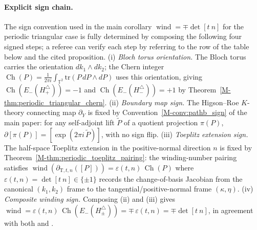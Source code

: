 \documentclass[11pt]{article}
\numberwithin{equation}{section}
\theoremstyle{definition}
\theoremstyle{remark}
\newcommand{\tr}{\mathrm{tr}}
\newcommand{\Ch}{\operatorname{Ch}}
\begin{document}
\paragraph{Explicit sign chain.}
The sign convention used in the main corollary \(\operatorname{wind}=\mp\det[t\ n]\) for the
periodic triangular case is fully determined by composing the following four signed steps; a
referee can verify each step by referring to the row of the table below and the cited
proposition.
(i) \emph{Bloch torus orientation.} The Bloch torus carries the orientation
\(dk_1\wedge dk_2\); the Chern integer
\(\Ch(P)=\frac{1}{2\pi i}\int_{\mathbb T^2}\tr(P\,dP\wedge dP)\) uses this orientation, giving
\(\Ch(E_-(H_+^\triangle))=-1\) and \(\Ch(E_-(H_-^\triangle))=+1\) by
Theorem~\ref{M-thm:periodic_triangular_chern}.
(ii) \emph{Boundary map sign.} The Higson--Roe \(K\)-theory connecting map \(\partial_Y\) is
fixed by Convention~\ref{M-conv:pathb_sign} of the main paper: for any self-adjoint lift
\(\tilde P\) of a quotient projection \(\pi(P)\),
\(\partial[\pi(P)]=[\exp(2\pi i\,\tilde P)]\), with no sign flip.
(iii) \emph{Toeplitz extension sign.} The half-space Toeplitz extension in the positive-normal
direction \(n\) is fixed by Theorem~\ref{M-thm:periodic_toeplitz_pairing}: the winding-number
pairing satisfies \(\operatorname{wind}(\partial_{\mathrm T,t,n}([P]))=\varepsilon(t,n)\,\Ch(P)\)
where \(\varepsilon(t,n)=\det[t\ n]\in\{\pm 1\}\) records the change-of-basis Jacobian from the
canonical \((k_1,k_2)\) frame to the tangential/positive-normal frame \((\kappa,\eta)\).
(iv) \emph{Composite winding sign.} Composing (ii) and (iii) gives
\(\operatorname{wind}=\varepsilon(t,n)\,\Ch(E_-(H_\pm^\triangle))=\mp\,\varepsilon(t,n)
=\mp\det[t\ n]\), in agreement with both
 and .
\end{document}
